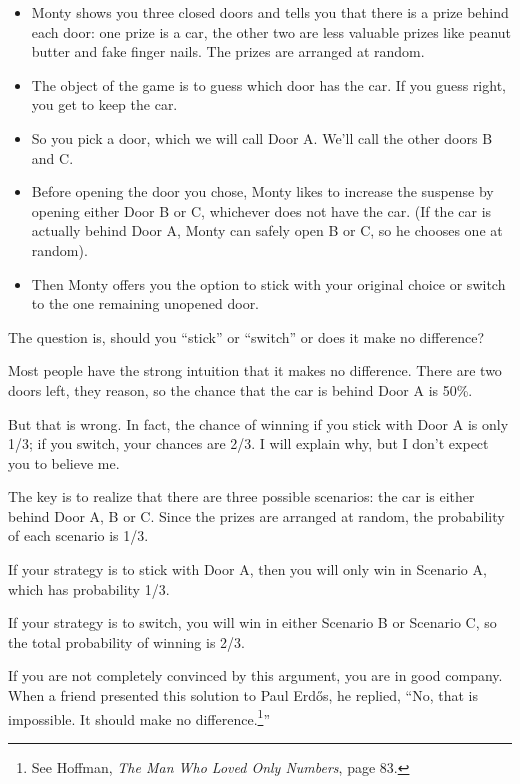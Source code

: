 \documentclass[12pt]{book}
\begin{document}
\begin{itemize}

\item Monty shows you three closed doors and tells you that there is a
  prize behind each door: one prize is a car, the other two are less
  valuable prizes like peanut butter and fake finger nails.  The
  prizes are arranged at random.

\item The object of the game is to guess which door has the car.  If
  you guess right, you get to keep the car.

\item So you pick a door, which we will call Door A.  We'll call the
  other doors B and C.

\item Before opening the door you chose, Monty likes to increase the
  suspense by opening either Door B or C, whichever does not
  have the car.  (If the car is actually behind Door A, Monty can
  safely open B or C, so he chooses one at random).

\item Then Monty offers you the option to stick with your original
  choice or switch to the one remaining unopened door.

\end{itemize}

The question is, should you ``stick'' or ``switch'' or does it
make no difference?

Most people have the strong intuition that it makes no difference.
There are two doors left, they reason, so the chance that the car
is behind Door A is 50\%.

But that is wrong.  In fact, the chance of winning if you stick
with Door A is only 1/3; if you switch, your chances are 2/3.
I will explain why, but I don't expect you to believe me.

The key is to realize that there are three possible scenarios:
the car is either behind Door A, B or C.  Since the prizes are
arranged at random, the probability of each scenario is 1/3.

If your strategy is to stick with Door A, then you will only
win in Scenario A, which has probability 1/3.

If your strategy is to switch, you will win in either Scenario
B or Scenario C, so the total probability of winning is 2/3.

\newcommand{\Erdos}{Erd\H{o}s}

If you are not completely convinced by this argument, you are
in good company.  When a friend presented this solution to
Paul \Erdos, he replied, ``No, that is impossible.  It should
make no difference.\footnote{See Hoffman, {\em The Man Who Loved
Only Numbers}, page 83.}''
\end{document}
